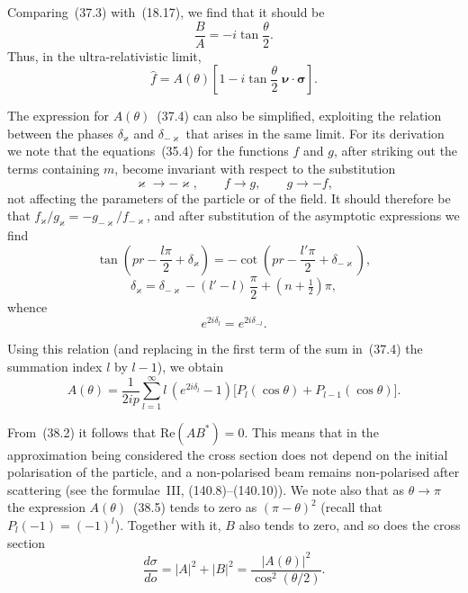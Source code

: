 Comparing~(37.3) with~(18.17), we find that it should be
\begin{equation}
\frac{B}{A} = -i\tan\frac{\theta}{2}.
\tag{38.2}
\end{equation}
Thus, in the ultra-relativistic limit,
\begin{equation}
\widehat f = A(\theta)\!\left[1 - i\tan\frac{\theta}{2}\;\boldsymbol{\nu}\cdot\boldsymbol{\sigma}\right].
\tag{38.3}
\end{equation}

The expression for $A(\theta)$~(37.4) can also be simplified, exploiting the relation between the phases $\delta_\varkappa$ and $\delta_{-\varkappa}$ that arises in the same limit. For its derivation we note that the equations~(35.4) for the functions $f$ and $g$, after striking out the terms containing $m$, become invariant with respect to the substitution
\[
\varkappa \to -\varkappa,\qquad f \to g,\qquad g \to -f,
\]
not affecting the parameters of the particle or of the field. It should therefore be that $f_\varkappa/g_\varkappa = -g_{-\varkappa}/f_{-\varkappa}$, and after substitution of the asymptotic expressions we find
\[
\tan\!\left(pr - \frac{l\pi}{2} + \delta_\varkappa\right) = -\cot\!\left(pr - \frac{l'\pi}{2} + \delta_{-\varkappa}\right),
\]
\[
\delta_\varkappa = \delta_{-\varkappa} - (l' - l)\,\frac{\pi}{2} + \left(n + \tfrac{1}{2}\right)\pi,
\]
whence
\begin{equation}
e^{2i\delta_l} = e^{2i\delta_{-l}}.
\tag{38.4}
\end{equation}

Using this relation (and replacing in the first term of the sum in~(37.4) the summation index $l$ by $l-1$), we obtain
\begin{equation}
A(\theta) = \frac{1}{2ip}\sum_{l=1}^{\infty}l\,(e^{2i\delta_l} - 1)\bigl[P_l(\cos\theta) + P_{l-1}(\cos\theta)\bigr].
\tag{38.5}
\end{equation}

From~(38.2) it follows that $\mathrm{Re}(AB^*) = 0$. This means that in the approximation being considered the cross section does not depend on the initial polarisation of the particle, and a non-polarised beam remains non-polarised after scattering (see the formulae~III, (140.8)--(140.10)). We note also that as $\theta \to \pi$ the expression $A(\theta)$~(38.5) tends to zero as $(\pi - \theta)^2$ (recall that $P_l(-1) = (-1)^l$). Together with it, $B$ also tends to zero, and so does the cross section
\begin{equation}
\frac{d\sigma}{do} = |A|^2 + |B|^2 = \frac{|A(\theta)|^2}{\cos^2(\theta/2)}.
\tag{38.6}
\end{equation}

